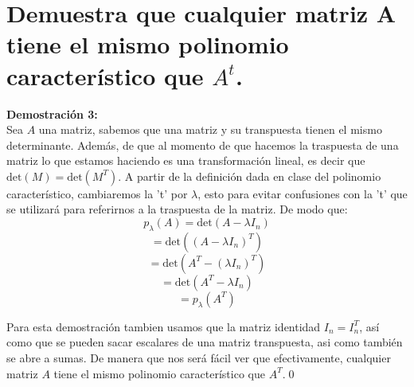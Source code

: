 \section{Demuestra que cualquier matriz A tiene el mismo polinomio caracter\'istico que $A^t$.\\}
\textbf{Demostraci\'on 3:}\\

Sea $A$ una matriz, sabemos que una matriz y su transpuesta tienen el mismo determinante. Además, de que al momento de que hacemos la traspuesta de una matriz lo que estamos haciendo es una transformaci\'on lineal, es decir que $\text{det}(M)=\text{det}(M^T)$. A partir de la  definici\'on dada en clase del polinomio característico, cambiaremos la 't' por $\lambda$, esto para evitar confusiones con la 't' que se utilizará para referirnos a la traspuesta de la matriz. De modo que:\\

\[p_\lambda(A) = \text{det}(A-\lambda I_n)\]
\[=\text{det}((A-\lambda I_n)^T)\]
\[=\text{det}(A^T-(\lambda I_n)^T)\]
\[=\text{det}(A^T-\lambda I_n)\]
\[=p_\lambda(A^T)\]

Para esta demostraci\'on tambien usamos que la matriz identidad $I_n=I_n^T$, as\'i como que se pueden sacar escalares de una matriz transpuesta, asi como tambi\'en se abre a sumas. De manera que nos ser\'a f\'acil ver que efectivamente, cualquier matriz $A$ tiene el mismo polinomio caracter\'istico que $A^T$.\qed 